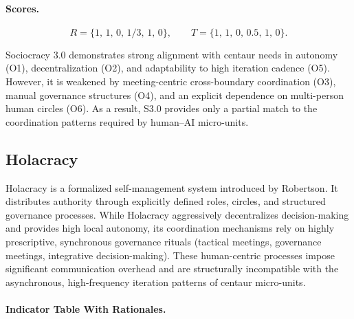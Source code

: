 \documentclass[11pt, a4paper, twocolumn]{article} %
\begin{document}
\paragraph{Scores.}

\[
R = \{1,\,1,\,0,\,1/3,\,1,\,0\},
\qquad
T = \{1,\,1,\,0,\,0.5,\,1,\,0\}.
\]

Sociocracy 3.0 demonstrates strong alignment with centaur needs in autonomy
(O1), decentralization (O2), and adaptability to high iteration cadence (O5).
However, it is weakened by meeting-centric cross-boundary coordination (O3),
manual governance structures (O4), and an explicit dependence on multi-person
human circles (O6). As a result, S3.0 provides only a partial match to the
coordination patterns required by human--AI micro-units.

\newpage
\subsection*{Holacracy}

Holacracy is a formalized self-management system introduced by Robertson. It
distributes authority through explicitly defined roles, circles, and structured
governance processes. While Holacracy aggressively decentralizes decision-making
and provides high local autonomy, its coordination mechanisms rely on highly
prescriptive, synchronous governance rituals (tactical meetings, governance
meetings, integrative decision-making). These human-centric processes impose
significant communication overhead and are structurally incompatible with the
asynchronous, high-frequency iteration patterns of centaur micro-units.

\paragraph{Indicator Table With Rationales.}
\end{document}
